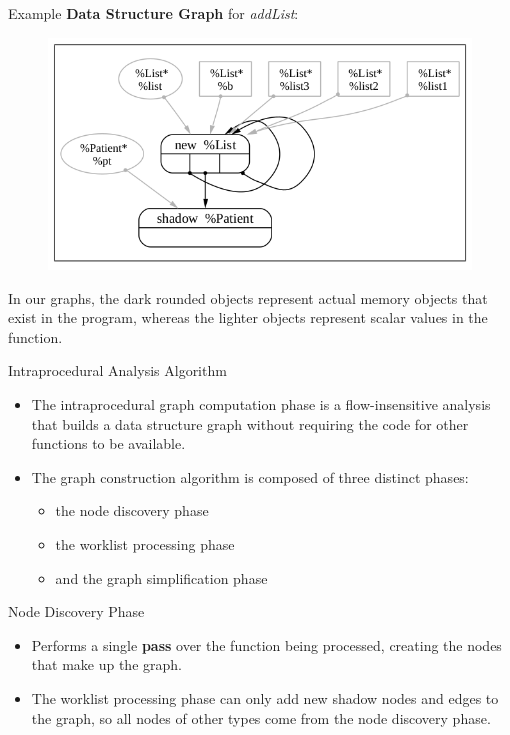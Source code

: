 \documentclass{beamer}
\begin{document}
\begin{frame}{Example}
  \textbf{Data Structure Graph} for \emph{addList}:
  \begin{figure}[H]
	\centering
	\includegraphics[scale=0.3]{./fig/dd.png}
  \end{figure}
  In our graphs, the dark
rounded objects represent actual memory objects that exist in the
program, whereas the lighter objects represent scalar values in
the function.
\end{frame}

\begin{frame}{Intraprocedural Analysis Algorithm}
  \begin{itemize}
\setlength{\itemsep}{0.5cm}
  \item The intraprocedural graph computation phase is a flow-insensitive analysis that builds a data structure graph without requiring the
code for other functions to be available.

\item The graph construction algorithm is composed of three distinct
phases:
\begin{itemize}
  \item the node discovery phase
	\item the worklist processing phase
	  \item and the graph simplification phase
\end{itemize}
\end{itemize}
\end{frame}

\begin{frame}{Node Discovery Phase}
  \begin{itemize}
	  \setlength{\itemsep}{0.5cm}
	\item Performs a single \textbf{pass} over the function being processed, creating the nodes that make up the graph.
\item The worklist processing phase can only add new shadow nodes and
edges to the graph, so all nodes of other types come from the node
discovery phase.
  \end{itemize}
\end{frame}
\end{document}
